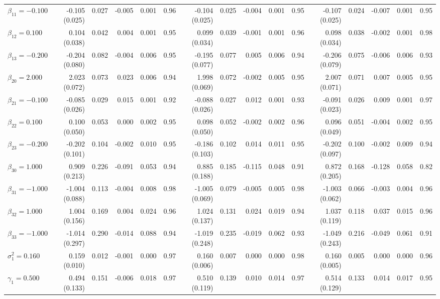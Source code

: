 \begin{landscape}
\begin{table}[ht]
\begin{tabular}{l|rrrrr:rrrrr:rrrrr}
  $\beta_{11}=-0.100$ & -0.105 (0.025) & 0.027 & -0.005 & 0.001 & 0.96 & -0.104 (0.025) & 0.025 & -0.004 & 0.001 & 0.95 & -0.107 (0.025) & 0.024 & -0.007 & 0.001 & 0.95 \\ 
  $\beta_{12}= 0.100$ &  0.104 (0.038) & 0.042 &  0.004 & 0.001 & 0.95 &  0.099 (0.034) & 0.039 & -0.001 & 0.001 & 0.96 &  0.098 (0.034) & 0.038 & -0.002 & 0.001 & 0.98 \\ 
  $\beta_{13}=-0.200$ & -0.204 (0.080) & 0.082 & -0.004 & 0.006 & 0.95 & -0.195 (0.077) & 0.077 &  0.005 & 0.006 & 0.94 & -0.206 (0.079) & 0.075 & -0.006 & 0.006 & 0.93 \\ 
  $\beta_{20}= 2.000$ &  2.023 (0.072) & 0.073 &  0.023 & 0.006 & 0.94 &  1.998 (0.069) & 0.072 & -0.002 & 0.005 & 0.95 &  2.007 (0.071) & 0.071 &  0.007 & 0.005 & 0.95 \\ 
  $\beta_{21}=-0.100$ & -0.085 (0.026) & 0.029 &  0.015 & 0.001 & 0.92 & -0.088 (0.026) & 0.027 &  0.012 & 0.001 & 0.93 & -0.091 (0.023) & 0.026 &  0.009 & 0.001 & 0.97 \\ 
  $\beta_{22}= 0.100$ &  0.100 (0.050) & 0.053 &  0.000 & 0.002 & 0.95 &  0.098 (0.050) & 0.052 & -0.002 & 0.002 & 0.96 &  0.096 (0.049) & 0.051 & -0.004 & 0.002 & 0.95 \\ 
  $\beta_{23}=-0.200$ & -0.202 (0.101) & 0.104 & -0.002 & 0.010 & 0.95 & -0.186 (0.103) & 0.102 &  0.014 & 0.011 & 0.95 & -0.202 (0.097) & 0.100 & -0.002 & 0.009 & 0.94 \\ 
  $\beta_{30}= 1.000$ &  0.909 (0.213) & 0.226 & -0.091 & 0.053 & 0.94 &  0.885 (0.188) & 0.185 & -0.115 & 0.048 & 0.91 &  0.872 (0.205) & 0.168 & -0.128 & 0.058 & 0.82 \\ 
  $\beta_{31}=-1.000$ & -1.004 (0.088) & 0.113 & -0.004 & 0.008 & 0.98 & -1.005 (0.069) & 0.079 & -0.005 & 0.005 & 0.98 & -1.003 (0.062) & 0.066 & -0.003 & 0.004 & 0.96 \\ 
  $\beta_{32}= 1.000$ &  1.004 (0.156) & 0.169 &  0.004 & 0.024 & 0.96 &  1.024 (0.137) & 0.131 &  0.024 & 0.019 & 0.94 &  1.037 (0.119) & 0.118 &  0.037 & 0.015 & 0.96 \\ 
  $\beta_{33}=-1.000$ & -1.014 (0.297) & 0.290 & -0.014 & 0.088 & 0.94 & -1.019 (0.248) & 0.235 & -0.019 & 0.062 & 0.93 & -1.049 (0.243) & 0.216 & -0.049 & 0.061 & 0.91 \\ 
  $\sigma^2_1= 0.160$ &  0.159 (0.010) & 0.012 & -0.001 & 0.000 & 0.97 &  0.160 (0.006) & 0.007 &  0.000 & 0.000 & 0.98 &  0.160 (0.005) & 0.005 &  0.000 & 0.000 & 0.96 \\ 
  $\gamma_1= 0.500$ &  0.494 (0.133) & 0.151 & -0.006 & 0.018 & 0.97 &  0.510 (0.119) & 0.139 &  0.010 & 0.014 & 0.97 &  0.514 (0.129) & 0.133 &  0.014 & 0.017 & 0.95 \\ 

\end{tabular}
\end{table}
\end{landscape}

